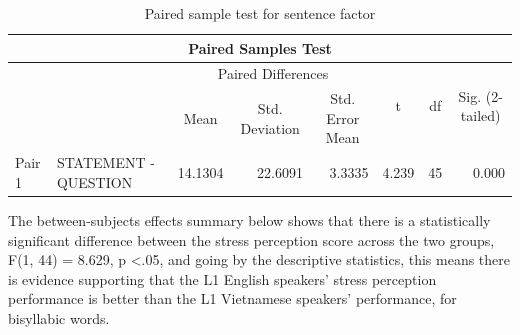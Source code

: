 \documentclass[a4paper]{article}
\begin{document}
\begin{table}[H]
\centering
      \caption{Paired sample test for sentence factor}
      \label{tab:sent2}
\begin{tabular}{|l|l|c|c|c|c|c|c|} 
\hline
\multicolumn{8}{|c|}{Paired Samples Test}                                                                                                                                                                                                  \\ 
\hline
       &                                    & \multicolumn{3}{c|}{Paired Differences}                                                           & \multirow{3}{*}{t}         & \multirow{3}{*}{df}     & \multirow{3}{*}{Sig. (2-tailed)}  \\ 
\cline{1-5}
       &                                    & \multirow{2}{*}{Mean}        & \multirow{2}{*}{Std. Deviation} & \multirow{2}{*}{Std. Error Mean} &                            &                         &                                   \\ 
\cline{1-2}
       &                                    &                              &                                 &                                  &                            &                         &                                   \\ 
\hline
Pair 1 & STATEMENT - QUESTION & \multicolumn{1}{r|}{14.1304} & \multicolumn{1}{r|}{22.6091}    & \multicolumn{1}{r|}{3.3335}      & \multicolumn{1}{r|}{4.239} & \multicolumn{1}{r|}{45} & \multicolumn{1}{r|}{0.000}        \\
\hline
\end{tabular}
\end{table}

The between-subjects effects summary below shows that there is a statistically significant difference between the stress perception score across the two groups, F(1, 44) =  8.629, p \textless .05, and going by the descriptive statistics, this means there is evidence supporting that the L1 English speakers' stress perception performance is better than the L1 Vietnamese speakers' performance, for bisyllabic words.
\end{document}
